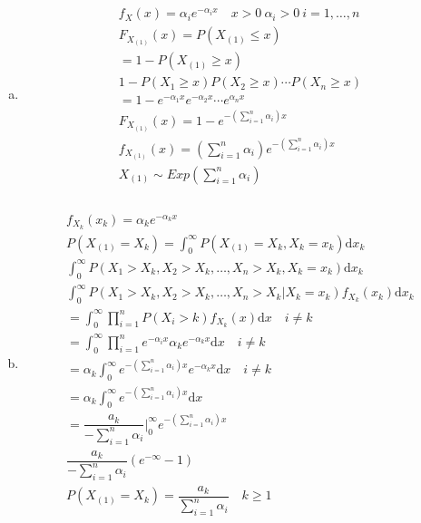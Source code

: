 \documentclass{article}
\newcommand{\dx}{\mathrm{d}x}
\begin{document}
\begin{flushleft}
\begin{enumerate}[(a)]
	\item 
\begin{multline*}\\
f_{X}(x)=\alpha_i e^{-\alpha_i x} \quad x>0 \ \alpha_i>0 \ i=1,\dots,n\\
F_{X_{(1)}}(x)=P(X_{(1)}\leq x)\\
=1-P(X_{(1)}\geq x)\\
1-P(X_{1}\geq x)P(X_2\geq x)\cdots P(X_n\geq x)\\
=1-e^{-\alpha_1 x}e^{-\alpha_2x}\cdots e^{\alpha_nx}\\
F_{X_{(1)}}(x)=1-e^{-\left(\sum_{i=1}^{n}\alpha_i \right)x}\\
f_{X_{(1)}}(x)=\left(\sum_{i=1}^{n}\alpha_i \right)e^{-\left(\sum_{i=1}^{n}\alpha_i \right)x}\\
X_{(1)}\sim Exp \left(\sum_{i=1}^{n}\alpha_i\right)\\
\end{multline*}
	\item 
\begin{multline*}\\
f_{X_k}(x_k)=\alpha_k e^{-\alpha_k x}\\
P(X_{(1)}=X_{k})=\int_{0}^{\infty}P(X_{(1)}=X_{k},X_k=x_k)\dx_k\\
\int_{0}^{\infty}P(X_1>X_k,X_2>X_k,\dots,X_n>X_k,X_k=x_k)\dx_k\\
\int_{0}^{\infty}P(X_1>X_k,X_2>X_k,\dots,X_n>X_k|X_k=x_k)f_{X_k}(x_k)\dx_k\\
=\int_{0}^{\infty}\prod_{i=1}^{n}P(X_i>k)f_{X_k}(x)\dx \quad i\neq k\\
=\int_{0}^{\infty}\prod_{i=1}^{n}e^{-\alpha _ix}\alpha_k e^{-\alpha_k x}\dx \quad i\neq k\\
=\alpha_k\int_{0}^{\infty}e^{-\left(\sum_{i=1}^{n}\alpha_i\right)x} e^{-\alpha_k x}\dx \quad i\neq k\\
=\alpha_k\int_{0}^{\infty}e^{-\left(\sum_{i=1}^{n}\alpha_i\right)x}\dx\\
=\dfrac{a_k}{-\sum_{i=1}^{n}\alpha_i}\bigg|_{0}^{\infty}e^{-\left(\sum_{i=1}^{n}\alpha_i\right)x}\\
\dfrac{a_k}{-\sum_{i=1}^{n}\alpha_i}(e^{-\infty}-1)\\
P(X_{(1)}=X_k)=\dfrac{a_k}{\sum_{i=1}^{n}\alpha_i} \quad k\geq 1\\
\end{multline*}

\end{enumerate}


\end{flushleft}
\end{document}
